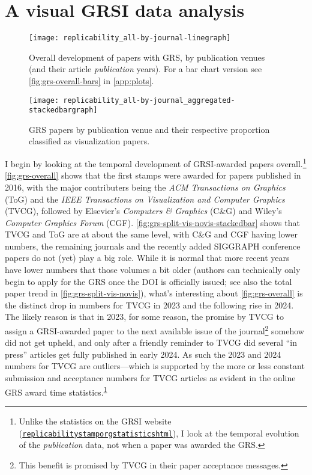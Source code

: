 \documentclass[conference]{vgtc}                     %
\begin{document}
\section{A visual GRSI data analysis}
\label{sec:visual_analysis}

\begin{figure}
	\centering
	\texttt{[image: replicability\_all-by-journal-linegraph]}
	\caption{Overall development of papers with GRS, by publication venues (and their article \emph{publication} years). For a bar chart version see \autoref{fig:grs-overall-bars} in \autoref{app:plots}.}
	\label{fig:grs-overall}
\end{figure}

\begin{figure}
	\centering
	\texttt{[image: replicability\_all-by-journal\_aggregated-stackedbargraph]}
	\caption{GRS papers by publication venue and their respective proportion classified as visualization papers.}
	\label{fig:grs-split-vis-novis-stackedbar}
\end{figure}

I begin by looking at the temporal development of GRSI-awarded papers overall.\footnote{\label{foot:grsi-statistics}Unlike the statistics on the GRSI website (\href{https://www.replicabilitystamp.org/statistics.html}{\texttt{replicabilitystamporg\discretionary{/}{}{/}statisticshtml}}), I look at the temporal evolution of the \emph{publication} data, not when a paper was awarded the GRS.} \autoref{fig:grs-overall} shows that the first stamps were awarded for papers published in 2016, with the major contributers being the \emph{ACM Transactions on Graphics} (ToG) and the \emph{IEEE Transactions on Visualization and Computer Graphics} (TVCG), followed by Elsevier's \emph{Computers \& Graphics} (C\&G) and Wiley's \emph{Computer Graphics Forum} (CGF). \autoref{fig:grs-split-vis-novis-stackedbar} shows that TVCG and ToG are at about the same level, with C\&G and CGF having lower numbers, the remaining journals and the recently added SIGGRAPH conference papers do not (yet) play a big role. While it is normal that more recent years have lower numbers that those volumes a bit older (authors can technically only begin to apply for the GRS once the DOI is officially issued; see also the total paper trend in \autoref{fig:grs-split-vis-novis}), what's interesting about \autoref{fig:grs-overall} is the distinct drop in numbers for TVCG in 2023 and the following rise in 2024. The likely reason is that in 2023, for some reason, the promise by TVCG to assign a GRSI-awarded paper to the next available issue of the journal\footnote{\label{foot:tvcg-fast-track}This benefit is promised by TVCG in their paper acceptance messages.} somehow did not get upheld, and only after a friendly reminder to TVCG did several ``in press'' articles get fully published in early 2024. As such the 2023 and 2024 numbers for TVCG are outliers---which is supported by the more or less constant submission and acceptance numbers for TVCG articles as evident in the online GRS award time statistics.\textsuperscript{\ref{foot:grsi-statistics}}
\end{document}
